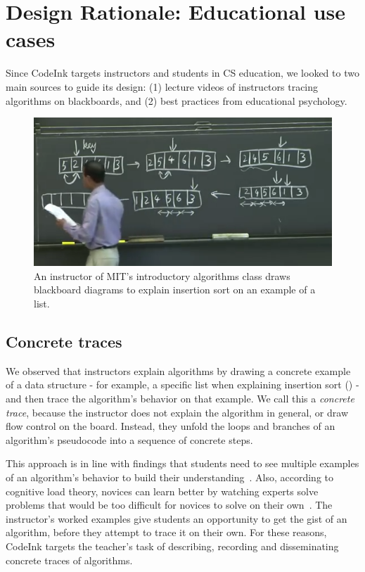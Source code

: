 \section{Design Rationale: Educational use cases}

Since CodeInk targets instructors and students in CS education, we looked to two
main sources to guide its design: (1) lecture videos of instructors tracing
algorithms on blackboards, and (2) best practices from educational psychology.

\begin{figure}[b!]

\begin{center}
\includegraphics[width=0.7\columnwidth]{img/6006/insertion.png}
\end{center}

\caption{An instructor of MIT's introductory algorithms class draws
blackboard diagrams to explain insertion sort on an example of a list.}
\label{fig:6006-insertion}
\end{figure}


\subsection{Concrete traces}
We observed that instructors explain algorithms by drawing a concrete example of
a data structure - for example, a specific list when explaining insertion sort
() - and then trace the algorithm's behavior on that
example. We call this a \emph{concrete trace}, because the instructor does not
explain the algorithm in general, or draw flow control on the board.
Instead, they unfold the loops and branches of an algorithm's pseudocode into a
sequence of concrete steps.

This approach is in line with findings that students need to see multiple
examples of an algorithm's behavior to build their
understanding~\cite{Vainio2007}.
Also, according to cognitive load theory, novices can learn better by watching
experts solve problems that would be too difficult for novices to solve on their
own~\cite{Linn1992}. The instructor's worked examples give students an
opportunity to get the gist of an algorithm, before they attempt to trace it on
their own. For these reasons, CodeInk targets the teacher's task of describing,
recording and disseminating concrete traces of algorithms.

